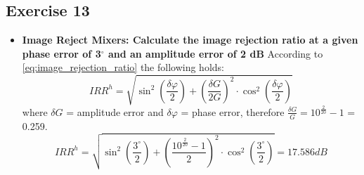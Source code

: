 \subsection{Exercise 13}
\begin{itemize}
    \item \textbf{Image Reject Mixers: Calculate the image rejection ratio at a given phase error of 3$^\circ$ and an amplitude error of 2 dB}\newline
    According to \autoref{eq:image_rejection_ratio} the following holds:
    $$
    I R R^h=\sqrt{\sin ^2\left(\frac{\delta \varphi}{2}\right)+\left(\frac{\delta G}{2 G}\right)^2 \cdot \cos ^2\left(\frac{\delta \varphi}{2}\right)}
    $$
    where $\delta G$ = amplitude error and $\delta \varphi$ = phase error, therefore $\frac{\delta G}{G}=10^{\frac{2}{20}}-1$ = 0.259.
     $$
    I R R^h=\sqrt{\sin ^2\left(\frac{3^{\circ}}{2}\right)+\left(\frac{10^{\frac{2}{20}}-1}{2}\right)^2 \cdot \cos ^2\left(\frac{3^{\circ}}{2}\right)}=17.586dB
    $$
\end{itemize}




